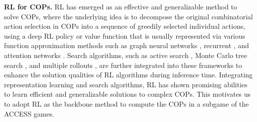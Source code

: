 \textbf{RL for COPs.} RL has emerged as an effective and generalizable method to solve COPs, where the underlying idea is to decompose the original combinatorial action selection in COPs into a sequence of greedily selected individual actions, using a deep RL policy or value function that is usually represented via various function approximation methods such as graph neural networks \citep{khalil2017learning,joshi2019efficient, manchanda2020gcomb}, recurrent \citep{bello2016neural}, and attention networks \citep{kool2018attention}. Search algorithms, such as active search \citep{hottung2021efficient}, Monte Carlo tree search \citep{fu2021generalize}, and multiple rollouts \citep{kwon2020pomo}, are further integrated into these frameworks to enhance the solution qualities of RL algorithms during inference time. Integrating representation learning and search algorithms, RL has shown promising abilities to learn efficient and generalizable solutions to complex COPs. This motivates us to adopt RL as the backbone method to compute the COPs in a subgame of the ACCESS games.



